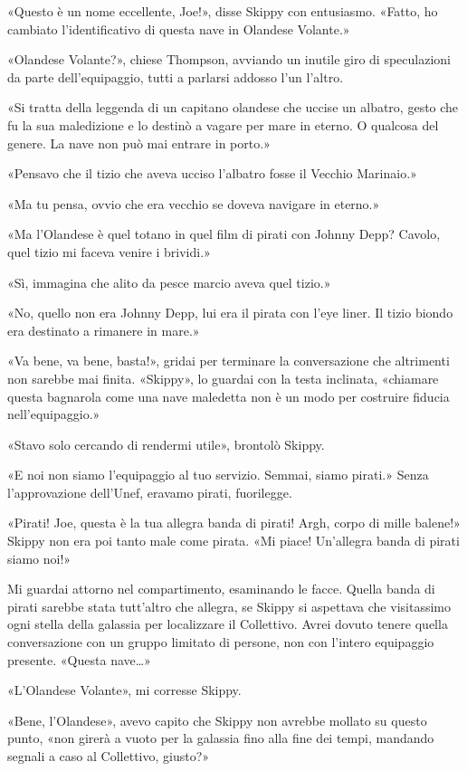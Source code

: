 «Questo è un nome eccellente, Joe!», disse Skippy con entusiasmo.
«Fatto, ho cambiato l'identificativo di questa nave in Olandese
Volante.»

«Olandese Volante?», chiese Thompson, avviando un inutile giro di
speculazioni da parte dell'equipaggio, tutti a parlarsi addosso l'un
l'altro.

«Si tratta della leggenda di un capitano olandese che uccise un albatro,
gesto che fu la sua maledizione e lo destinò a vagare per mare in
eterno. O qualcosa del genere. La nave non può mai entrare in porto.»

«Pensavo che il tizio che aveva ucciso l'albatro fosse il Vecchio
Marinaio.»

«Ma tu pensa, ovvio che era vecchio se doveva navigare in eterno.»

«Ma l'Olandese è quel totano in quel film di pirati con Johnny Depp?
Cavolo, quel tizio mi faceva venire i brividi.»

«Sì, immagina che alito da pesce marcio aveva quel tizio.»

«No, quello non era Johnny Depp, lui era il pirata con l'eye liner. Il
tizio biondo era destinato a rimanere in mare.»

«Va bene, va bene, basta!», gridai per terminare la conversazione che
altrimenti non sarebbe mai finita. «Skippy», lo guardai con la testa
inclinata, «chiamare questa bagnarola come una nave maledetta non è un
modo per costruire fiducia nell'equipaggio.»

«Stavo solo cercando di rendermi utile», brontolò Skippy.

«E noi non siamo l'equipaggio al tuo servizio. Semmai, siamo pirati.»
Senza l'approvazione dell'Unef, eravamo pirati, fuorilegge.

«Pirati! Joe, questa è la tua allegra banda di pirati! Argh, corpo di
mille balene!» Skippy non era poi tanto male come pirata. «Mi piace!
Un'allegra banda di pirati siamo noi!»

Mi guardai attorno nel compartimento, esaminando le facce. Quella banda
di pirati sarebbe stata tutt'altro che allegra, se Skippy si aspettava
che visitassimo ogni stella della galassia per localizzare il
Collettivo. Avrei dovuto tenere quella conversazione con un gruppo
limitato di persone, non con l'intero equipaggio presente. «Questa
nave\ldots»

«L'Olandese Volante», mi corresse Skippy.

«Bene, l'Olandese», avevo capito che Skippy non avrebbe mollato su
questo punto, «non girerà a vuoto per la galassia fino alla fine dei
tempi, mandando segnali a caso al Collettivo, giusto?»

